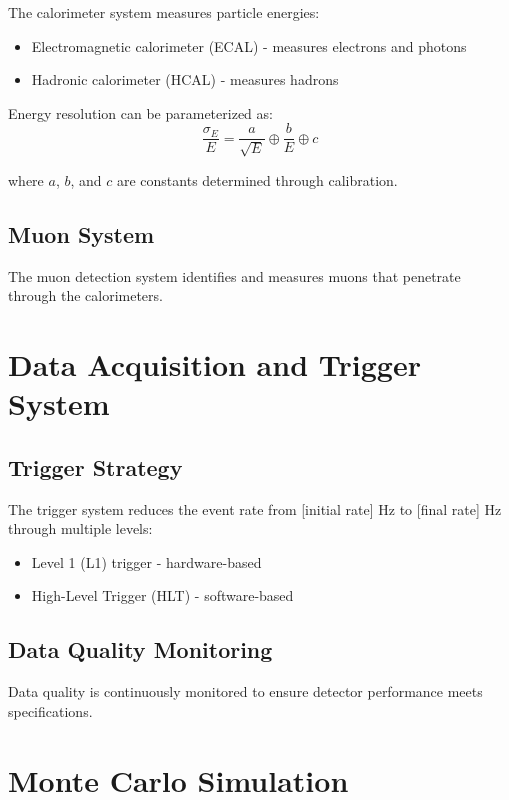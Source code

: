 The calorimeter system measures particle energies:
\begin{itemize}
  \item Electromagnetic calorimeter (ECAL) - measures electrons and photons
  \item Hadronic calorimeter (HCAL) - measures hadrons
\end{itemize}

Energy resolution can be parameterized as:
\begin{equation}
  \frac{\sigma_E}{E} = \frac{a}{\sqrt{E}} \oplus \frac{b}{E} \oplus c
  \label{eq:energy-resolution}
\end{equation}

where $a$, $b$, and $c$ are constants determined through calibration.

\subsection{Muon System}

The muon detection system identifies and measures muons that penetrate through the calorimeters.

\section{Data Acquisition and Trigger System}

\subsection{Trigger Strategy}

The trigger system reduces the event rate from [initial rate] Hz to [final rate] Hz through multiple levels:
\begin{itemize}
  \item Level 1 (L1) trigger - hardware-based
  \item High-Level Trigger (HLT) - software-based
\end{itemize}

\subsection{Data Quality Monitoring}

Data quality is continuously monitored to ensure detector performance meets specifications.

\section{Monte Carlo Simulation}

